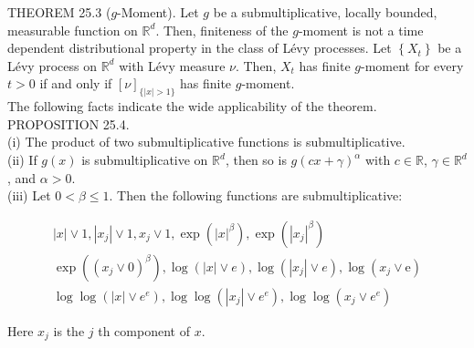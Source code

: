 \documentclass[a4paper,11pt]{article}
\begin{document}
THEOREM 25.3 ($g$-Moment). Let $g$ be a submultiplicative, locally bounded, measurable
function on $\mathbb{R}^{d}$. Then, finiteness of the $g$-moment is not a time dependent
distributional property in the class of Lévy processes. Let $\left\{X_{t}\right\}$ be a Lévy process
on $\mathbb{R}^{d}$ with Lévy measure $\nu$. Then, $X_{t}$ has finite $g$-moment for every $t>0$ if
and only if $[\nu]_{\{|x|>1\}}$ has finite $g$-moment. \\

The following facts indicate the wide applicability of the theorem. \\

PROPOSITION 25.4. \\
(i) The product of two submultiplicative functions is submultiplicative. \\
(ii) If $g(x)$ is submultiplicative on $\mathbb{R}^{d}$, then so is $g(c x+\gamma)^{\alpha}$
with $c \in \mathbb{R}$, $\gamma \in \mathbb{R}^{d}$, and $\alpha>0$. \\
(iii) Let $0<\beta \leq 1$. Then the following functions are submultiplicative:

$$
    \begin{gathered}
        |x| \vee 1,\left|x_{j}\right| \vee 1, x_{j} \vee 1, \exp \left(|x|^{\beta}\right), \exp \left(\left|x_{j}\right|^{\beta}\right) \\
        \exp \left(\left(x_{j} \vee 0\right)^{\beta}\right), \log (|x| \vee e), \log \left(\left|x_{j}\right| \vee e\right), \log \left(x_{j} \vee \mathrm{e}\right) \\
        \log \log \left(|x| \vee e^{e}\right), \log \log \left(\left|x_{j}\right| \vee e^{e}\right), \log \log \left(x_{j} \vee e^{e}\right)
    \end{gathered}
$$

Here $x_{j}$ is the $j$ th component of $x$.
\end{document}
